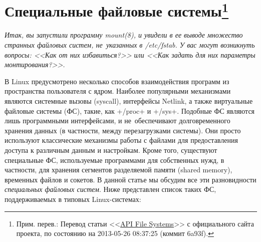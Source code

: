 \documentclass[10pt,oneside,a4paper]{article}
\newcommand{\sfnote}[1]{\texorpdfstring{\protect\footnote%
	{Прим. перев.: #1}}{}}
\newcommand\yousaywtf[1]{\emph{#1}}
\newcommand\yousaywtfsk[1]{\yousaywtf{#1}\medskip\par}
\begin{document}
\section{Специальные файловые системы\sfnote{Перевод статьи
<<\href{http://www.freedesktop.org/wiki/Software/systemd/APIFileSystems}{API
File Systems}>> с официального сайта проекта, по состоянию на 2013-05-26
08:37:25 (коммит 6a93f).}}
\label{sec:apifs}

\yousaywtfsk{Итак, вы запустили программу mount(8), и увидели в ее выводе
множество странных файловых систем, не~указанных в /etc/fstab. У вас могут
возникнуть вопросы: <<Как от них избавиться?>> или <<Как задать для них
параметры монтирования?>>.}

В Linux предусмотрено несколько способов взаимодействия программ из пространства
пользователя с ядром. Наиболее популярными механизмами являются системные вызовы
(syscall), интерфейсы Netlink, а также виртуальные файловые системы (ФС), такие,
как +/proc+ и +/sys+. Подобные ФС являются лишь программными интерфейсами, и
не~обеспечивают долговременного хранения данных (в частности, между
перезагрузками системы). Они просто используют классические механизмы работы с
файлами для предоставления доступа к различным данным и настройкам.  Кроме того,
существуют специальные ФС, используемые программами для собственных нужд, в
частности, для хранения сегментов разделяемой памяти (shared memory), временных
файлов и сокетов. В данной статье мы обсудим все эти разновидности
\emph{специальных файловых систем}. Ниже представлен список таких ФС,
поддерживаемых в типовых Linux-системах:
\end{document}
